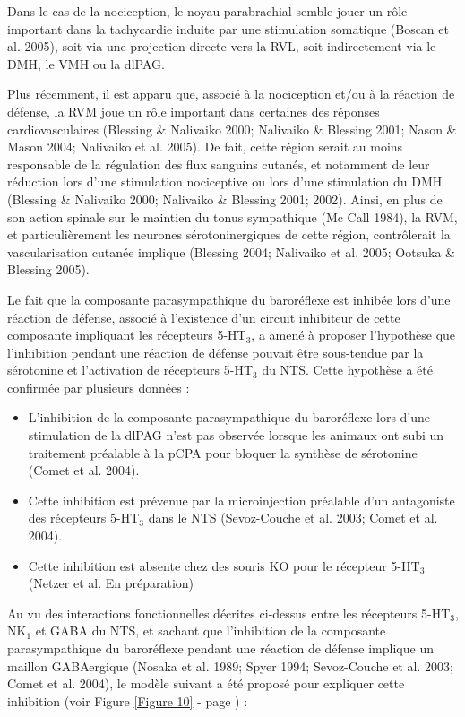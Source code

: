 \documentclass[a4paper,12pt,twoside]{report}
\begin{document}
Dans le cas de la nociception, le noyau parabrachial semble jouer un rôle important dans la tachycardie induite par une stimulation somatique (Boscan et al. 2005), soit via une projection directe vers la RVL, soit indirectement via le DMH, le VMH ou la dlPAG.

Plus récemment, il est apparu que, associé à la nociception et/ou à la réaction de défense, la RVM joue un rôle important dans certaines des réponses cardiovasculaires (Blessing \& Nalivaiko 2000; Nalivaiko \& Blessing 2001; Nason \& Mason 2004; Nalivaiko et al. 2005). De fait, cette région serait au moins responsable de la régulation des flux sanguins cutanés, et notamment de leur réduction lors d’une stimulation nociceptive ou lors d’une stimulation du DMH (Blessing \& Nalivaiko 2000; Nalivaiko \& Blessing 2001; 2002). Ainsi, en plus de son action spinale sur le maintien du tonus sympathique (Mc Call 1984), la RVM, et particulièrement les neurones sérotoninergiques de cette région, contrôlerait la vascularisation cutanée implique (Blessing 2004; Nalivaiko et al. 2005; Ootsuka \& Blessing 2005).

Le fait que la composante parasympathique du baroréflexe est inhibée lors d’une réaction de défense, associé à l’existence d’un circuit inhibiteur de cette composante impliquant les récepteurs 5-HT$_{3}$, a amené à proposer l’hypothèse que l’inhibition pendant une réaction de défense pouvait être sous-tendue par la sérotonine et l’activation de récepteurs 5-HT$_{3}$ du NTS. Cette hypothèse a été confirmée par plusieurs données :

\begin{itemize}
\item L’inhibition de la composante parasympathique du baroréflexe lors d’une stimulation de la dlPAG n’est pas observée lorsque les animaux ont subi un traitement préalable à la pCPA pour bloquer la synthèse de sérotonine (Comet et al. 2004). 
\item Cette inhibition est prévenue par la microinjection préalable d’un antagoniste des récepteurs 5-HT$_{3}$ dans le NTS (Sevoz-Couche et al. 2003; Comet et al. 2004).
\item Cette inhibition est absente chez des souris KO pour le récepteur 5-HT$_{3}$ (Netzer et al. En préparation)
\end{itemize}

Au vu des interactions fonctionnelles décrites ci-dessus entre les récepteurs 5-HT$_{3}$, NK$_{1}$ et GABA du NTS, et sachant que l’inhibition de la composante parasympathique du baroréflexe pendant une réaction de défense implique un maillon GABAergique (Nosaka et al. 1989; Spyer 1994; Sevoz-Couche et al. 2003; Comet et al. 2004), le modèle suivant a été proposé pour expliquer cette inhibition (voir Figure \ref{Figure 10} - page \pageref{Figure 10}) :
\end{document}
